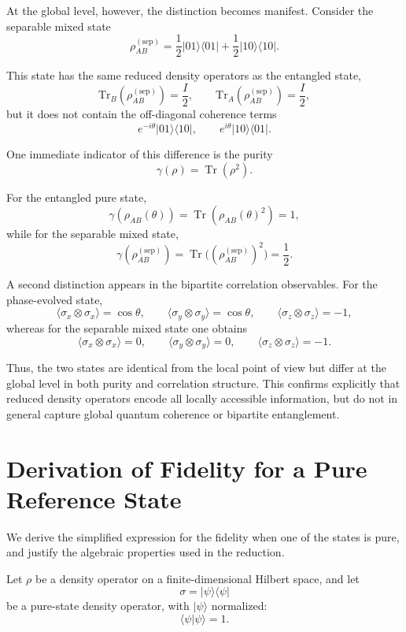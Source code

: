 \documentclass[a4paper]{article}
\begin{document}
\medskip

At the global level, however, the distinction becomes manifest. Consider the separable mixed state
\[
\rho_{AB}^{(\mathrm{sep})}
=
\frac{1}{2}|01\rangle\langle 01|
+
\frac{1}{2}|10\rangle\langle 10|.
\]

This state has the same reduced density operators as the entangled state,
\[
\mathrm{Tr}_B(\rho_{AB}^{(\mathrm{sep})}) = \frac{I}{2},
\qquad
\mathrm{Tr}_A(\rho_{AB}^{(\mathrm{sep})}) = \frac{I}{2},
\]
but it does not contain the off-diagonal coherence terms
\[
e^{-i\theta}|01\rangle\langle 10|,
\qquad
e^{i\theta}|10\rangle\langle 01|.
\]

One immediate indicator of this difference is the purity
\[
\gamma(\rho) = \operatorname{Tr}(\rho^2).
\]

For the entangled pure state,
\[
\gamma(\rho_{AB}(\theta)) = \operatorname{Tr}(\rho_{AB}(\theta)^2) = 1,
\]
while for the separable mixed state,
\[
\gamma(\rho_{AB}^{(\mathrm{sep})}) = \operatorname{Tr}\big((\rho_{AB}^{(\mathrm{sep})})^2\big) = \frac{1}{2}.
\]

A second distinction appears in the bipartite correlation observables. For the phase-evolved state,
\[
\langle \sigma_x \otimes \sigma_x \rangle = \cos\theta, \qquad
\langle \sigma_y \otimes \sigma_y \rangle = \cos\theta, \qquad
\langle \sigma_z \otimes \sigma_z \rangle = -1,
\]
whereas for the separable mixed state one obtains
\[
\langle \sigma_x \otimes \sigma_x \rangle = 0, \qquad
\langle \sigma_y \otimes \sigma_y \rangle = 0, \qquad
\langle \sigma_z \otimes \sigma_z \rangle = -1.
\]

Thus, the two states are identical from the local point of view but differ at the global level in both purity and correlation structure. This confirms explicitly that reduced density operators encode all locally accessible information, but do not in general capture global quantum coherence or bipartite entanglement.

\section{Derivation of Fidelity for a Pure Reference State}

We derive the simplified expression for the fidelity when one of the states is pure, and justify the algebraic properties used in the reduction.

\medskip

Let $\rho$ be a density operator on a finite-dimensional Hilbert space, and let
\[
\sigma = |\psi\rangle\langle\psi|
\]
be a pure-state density operator, with $|\psi\rangle$ normalized:
\[
\langle \psi | \psi \rangle = 1.
\]
\end{document}

